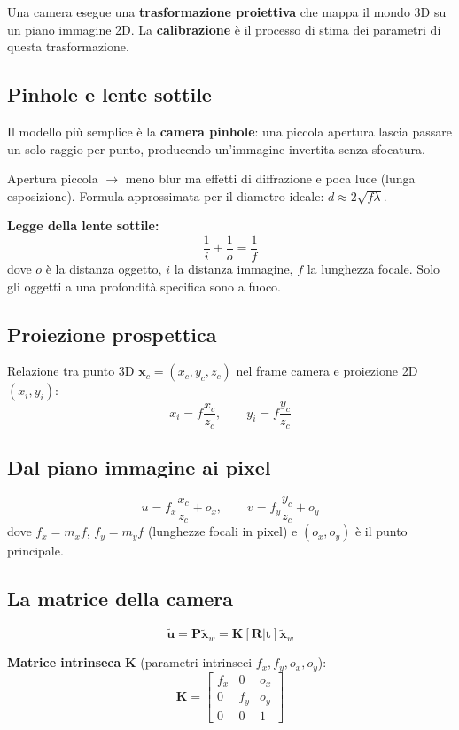 \documentclass[12pt, a4paper]{report}
\begin{document}
Una camera esegue una \textbf{trasformazione proiettiva} che mappa il mondo 3D
su un piano immagine 2D. La \textbf{calibrazione} è il processo di stima dei
parametri di questa trasformazione.

\subsection{Pinhole e lente sottile}

Il modello più semplice è la \textbf{camera pinhole}: una piccola apertura lascia
passare un solo raggio per punto, producendo un'immagine invertita senza sfocatura.

\begin{notebox}
Apertura piccola $\to$ meno blur ma effetti di diffrazione e poca luce
(lunga esposizione). Formula approssimata per il diametro ideale:
$d\approx2\sqrt{f\lambda}$.
\end{notebox}

\textbf{Legge della lente sottile:}
\[
  \frac{1}{i}+\frac{1}{o}=\frac{1}{f}
\]
dove $o$ è la distanza oggetto, $i$ la distanza immagine, $f$ la lunghezza focale.
Solo gli oggetti a una profondità specifica sono a fuoco.

\subsection{Proiezione prospettica}

Relazione tra punto 3D $\mathbf{x}_c=(x_c,y_c,z_c)$ nel frame camera e
proiezione 2D $(x_i,y_i)$:
\[
  x_i=f\frac{x_c}{z_c}, \qquad y_i=f\frac{y_c}{z_c}
\]

\subsection{Dal piano immagine ai pixel}

\[
  u=f_x\frac{x_c}{z_c}+o_x, \qquad v=f_y\frac{y_c}{z_c}+o_y
\]
dove $f_x=m_xf$, $f_y=m_yf$ (lunghezze focali in pixel) e $(o_x,o_y)$ è il
punto principale.

\subsection{La matrice della camera}

\[
  \tilde{\mathbf{u}}=\mathbf{P}\tilde{\mathbf{x}}_w=\mathbf{K}[\mathbf{R}|\mathbf{t}]\tilde{\mathbf{x}}_w
\]

\textbf{Matrice intrinseca} $\mathbf{K}$ (parametri intrinseci $f_x,f_y,o_x,o_y$):
\[
  \mathbf{K}=\begin{bmatrix}f_x&0&o_x\\0&f_y&o_y\\0&0&1\end{bmatrix}
\]
\end{document}
